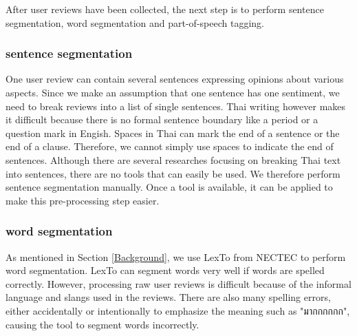 After user reviews have been collected, the next step is to perform sentence segmentation, word segmentation and part-of-speech tagging. 

\subsubsection{sentence segmentation}
One user review can contain several sentences expressing opinions about various aspects. 
Since we make an assumption that one sentence has one sentiment, we need to break reviews into a list of single sentences. Thai writing however makes it difficult because there is no formal sentence boundary like a period or a question mark in Engish. Spaces in Thai can mark the end of a sentence or the end of a clause. Therefore, we cannot simply use spaces to indicate the end of sentences. Although there are several researches focusing on breaking Thai text into sentences, there are no tools that can easily be used. We therefore perform sentence segmentation manually. Once a tool is available, it can be applied to make this pre-processing step easier. 

\subsubsection{word segmentation}
As mentioned in Section \ref{Background}, we use LexTo\cite{LexTo} from NECTEC to perform word segmentation. LexTo can segment words very well if words are spelled correctly. However, processing raw user reviews is difficult because of the informal language and slangs used in the reviews. There are also many spelling errors, either accidentally or intentionally to emphasize the meaning such as "{มากกกกกก}", causing the tool to segment words incorrectly. 


